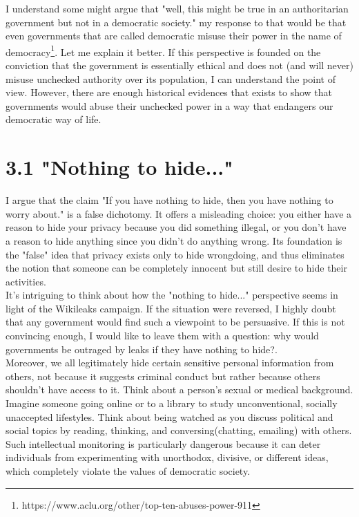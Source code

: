 \documentclass[11pt]{report}
\begin{document}
I understand some might argue that "well, this might be true in an authoritarian government but not in a democratic society." my response to that would be that even governments that are called democratic misuse their power in the name of democracy\footnote{https://www.aclu.org/other/top-ten-abuses-power-911}. Let me explain it better. If this perspective is founded on the conviction that the government is essentially ethical and does not (and will never) misuse unchecked authority over its population, I can understand the point of view. However, there are enough historical evidences that exists to show that governments would abuse their unchecked power in a way that endangers our democratic way of life.\\ 

\section*{3.1 "Nothing to hide..."}


I argue that the claim "If you have nothing to hide, then you have nothing to worry about." is a false dichotomy. It offers a misleading choice: you either have a reason to hide your privacy because you did something illegal, or you don't have a reason to hide anything since you didn't do anything wrong. Its foundation is the "false" idea that privacy exists only to hide wrongdoing, and thus eliminates the notion that someone can be completely innocent but still desire to hide their activities.\\ 

It's intriguing to think about how the "nothing to hide..." perspective seems in light of the Wikileaks campaign. If the situation were reversed, I highly doubt that any government would find such a viewpoint to be persuasive. If this is not convincing enough, I would like to leave them with a question: why would governments be outraged by leaks if they have nothing to hide?.\\

Moreover, we all legitimately hide certain sensitive personal information from others, not because it suggests criminal conduct but rather because others shouldn't have access to it. Think about a person's sexual or medical background. Imagine someone going online or to a library to study unconventional, socially unaccepted lifestyles. Think about being watched as you discuss political and social topics by reading, thinking, and conversing(chatting, emailing) with others. Such intellectual monitoring is particularly dangerous because it can deter individuals from experimenting with unorthodox, divisive, or different ideas, which completely violate the values of democratic society. \\
\end{document}
